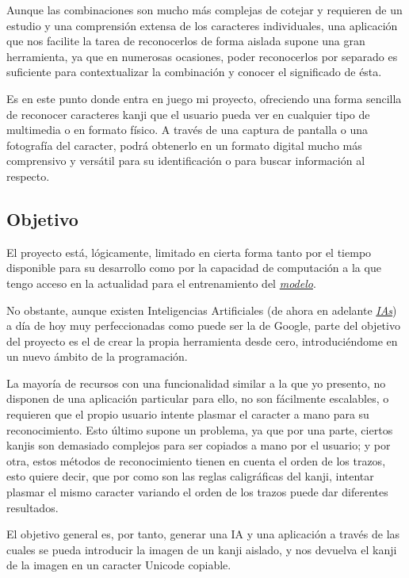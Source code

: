 \documentclass{article}
\begin{document}
Aunque las combinaciones son mucho más complejas de cotejar y requieren de un estudio y una comprensión extensa de los caracteres individuales, una aplicación que nos facilite la tarea de reconocerlos de forma aislada supone una gran herramienta, ya que en numerosas ocasiones, poder reconocerlos por separado es suficiente para contextualizar la combinación y conocer el significado de ésta.

Es en este punto donde entra en juego mi proyecto, ofreciendo una forma sencilla de reconocer caracteres kanji que el usuario pueda ver en cualquier tipo de multimedia o en formato físico. A través de una captura de pantalla o una fotografía del caracter, podrá obtenerlo en un formato digital mucho más comprensivo y versátil para su identificación o para buscar información al respecto.

\subsection{Objetivo}
El proyecto está, lógicamente, limitado en cierta forma tanto por el tiempo disponible para su desarrollo como por la capacidad de computación a la que tengo acceso en la actualidad para el entrenamiento del \hyperref[sec:terms]{\textit{modelo}\tec}.

No obstante, aunque existen Inteligencias Artificiales (de ahora en adelante \hyperref[sec:terms]{\textit{IAs}\tec}) a día de hoy muy perfeccionadas como puede ser la de Google, parte del objetivo del proyecto es el de crear la propia herramienta desde cero, introduciéndome en un nuevo ámbito de la programación.

La mayoría de recursos con una funcionalidad similar a la que yo presento, no disponen de una aplicación particular para ello, no son fácilmente escalables, o requieren que el propio usuario intente plasmar el caracter a mano para su reconocimiento. Esto último supone un problema, ya que por una parte, ciertos kanjis son demasiado complejos para ser copiados a mano por el usuario; y por otra, estos métodos de reconocimiento tienen en cuenta el orden de los trazos, esto quiere decir, que por como son las reglas caligráficas del kanji, intentar plasmar el mismo caracter variando el orden de los trazos puede dar diferentes resultados.

El objetivo general es, por tanto, generar una IA y una aplicación a través de las cuales se pueda introducir la imagen de un kanji aislado, y nos devuelva el kanji de la imagen en un caracter Unicode copiable.
\end{document}
